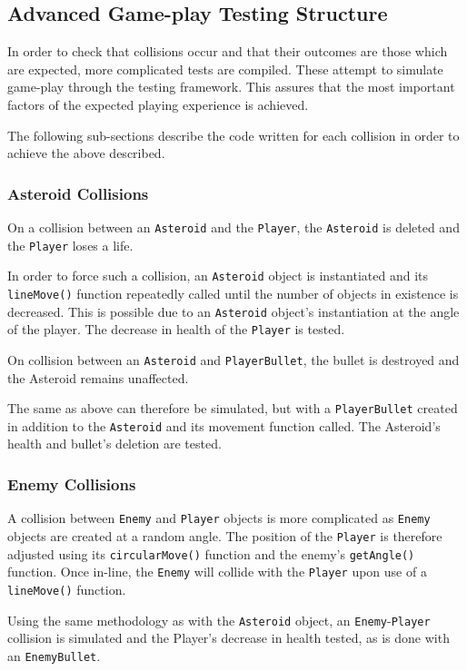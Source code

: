 \documentclass[10pt,twocolumn]{witseiepaper}
\begin{document}
\subsection{Advanced Game-play Testing Structure}
In order to check that collisions occur and that their outcomes are those which are expected, more complicated tests are compiled. These attempt to simulate game-play through the testing framework. This assures that the most important factors of the expected playing experience is achieved.

The following sub-sections describe the code written for each collision in order to achieve the above described.
\subsubsection{Asteroid Collisions}
On a collision between an \texttt{Asteroid} and the \texttt{Player}, the \texttt{Asteroid} is deleted and the \texttt{Player} loses a life. 

In order to force such a collision, an \texttt{Asteroid} object is instantiated and its \texttt{lineMove()} function repeatedly called until the number of objects in existence is decreased. This is possible due to an \texttt{Asteroid} object's instantiation at the angle of the player. The decrease in health of the \texttt{Player} is tested.

On collision between an \texttt{Asteroid} and \texttt{PlayerBullet}, the bullet is destroyed and the Asteroid remains unaffected.

The same as above can therefore be simulated, but with a \texttt{PlayerBullet} created in addition to the \texttt{Asteroid} and its movement function called. The Asteroid's health and bullet's deletion are tested.
\subsubsection{Enemy Collisions}
A collision between \texttt{Enemy} and \texttt{Player} objects is more complicated as \texttt{Enemy} objects are created at a random angle. The position of the \texttt{Player} is therefore adjusted using its \texttt{circularMove()} function and the enemy's \texttt{getAngle()} function. Once in-line, the \texttt{Enemy} will collide with the \texttt{Player} upon use of a \texttt{lineMove()} function.

Using the same methodology as with the \texttt{Asteroid} object, an \texttt{Enemy}-\texttt{Player} collision is simulated and the Player's decrease in health tested, as is done with an \texttt{EnemyBullet}.
\end{document}
